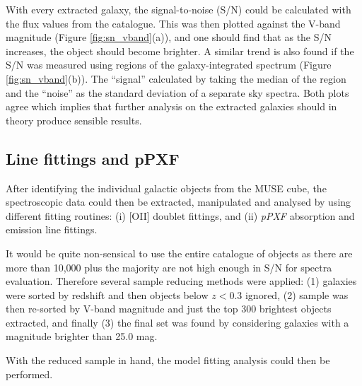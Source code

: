 \documentclass[12pt, twocolumn]{revtex4}    %
\begin{document}

With every extracted galaxy, the signal-to-noise (S/N) could be calculated with the flux values from the catalogue. This was then plotted against the V-band magnitude (Figure \ref{fig:sn_vband}(a)), and one should find that as the S/N increases, the object should become brighter. A similar trend is also found if the S/N was measured using regions of the galaxy-integrated spectrum (Figure \ref{fig:sn_vband}(b)). The ``signal'' calculated by taking the median of the region and the ``noise'' as the standard deviation of a separate sky spectra. Both plots agree which implies that further analysis on the extracted galaxies should in theory produce sensible results. 

\subsection{Line fittings and pPXF} 

After identifying the individual galactic objects from the MUSE cube, the spectroscopic data could then be extracted, manipulated and analysed by using different fitting routines: (i) [OII] doublet fittings, and (ii) \textit{pPXF} absorption and emission line fittings.


It would be quite non-sensical to use the entire catalogue of objects as there are more than 10,000 plus the majority are not high enough in S/N for spectra evaluation. Therefore several sample reducing methods were applied: (1) galaxies were sorted by redshift and then objects below $z<0.3$ ignored, (2) sample was then re-sorted by V-band magnitude and just the top 300 brightest objects extracted, and finally (3) the final set was found by considering galaxies with a magnitude brighter than 25.0 mag. 

With the reduced sample in hand, the model fitting analysis could then be performed.




\end{document}
